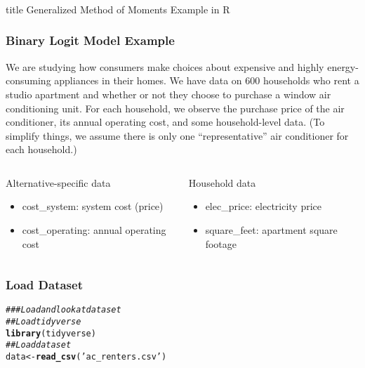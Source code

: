 \documentclass{beamer}\usepackage[]{graphicx}\usepackage[]{color}
\makeatletter
\newcommand{\hlstr}[1]{\textcolor[rgb]{0.192,0.494,0.8}{#1}}%
\newcommand{\hlcom}[1]{\textcolor[rgb]{0.678,0.584,0.686}{\textit{#1}}}%
\newcommand{\hlstd}[1]{\textcolor[rgb]{0.345,0.345,0.345}{#1}}%
\newcommand{\hlkwb}[1]{\textcolor[rgb]{0.69,0.353,0.396}{#1}}%
\newcommand{\hlkwd}[1]{\textcolor[rgb]{0.737,0.353,0.396}{\textbf{#1}}}%
\newenvironment{kframe}{%
 \def\at@end@of@kframe{}%
 \ifinner\ifhmode%
  \def\at@end@of@kframe{\end{minipage}}%
  \begin{minipage}{\columnwidth}%
 \fi\fi%
 \def\FrameCommand##1{\hskip\@totalleftmargin \hskip-\fboxsep
 \colorbox{shadecolor}{##1}\hskip-\fboxsep
     \hskip-\linewidth \hskip-\@totalleftmargin \hskip\columnwidth}%
 \MakeFramed {\advance\hsize-\width
   \@totalleftmargin\z@ \linewidth\hsize
   \@setminipage}}%
 {\par\unskip\endMakeFramed%
 \at@end@of@kframe}
\newenvironment{knitrout}{}{} %
\makeatother
\begin{document}
\begin{frame}\frametitle{}
    \vfill
    \centering
    \begin{beamercolorbox}[center]{title}
        \Large Generalized Method of Moments Example in R
    \end{beamercolorbox}
    \vfill
\end{frame}

\begin{frame}\frametitle{Binary Logit Model Example}
    We are studying how consumers make choices about expensive and highly energy-consuming appliances in their homes. We have data on 600 households who rent a studio apartment and whether or not they choose to purchase a window air conditioning unit. For each household, we observe the purchase price of the air conditioner, its annual operating cost, and some household-level data. (To simplify things, we assume there is only one ``representative'' air conditioner for each household.)
    \vspace{3ex}
    \begin{columns}
        \begin{column}{0.5\textwidth}
            Alternative-specific data
            \begin{itemize}
                \item cost\_system: system cost (price)
                \item cost\_operating: annual operating cost
            \end{itemize}
        \end{column}
        \begin{column}{0.5\textwidth}
            Household data
            \begin{itemize}
                \item elec\_price: electricity price
                \item square\_feet: apartment square footage
            \end{itemize}
            \vspace{2ex}
        \end{column}
    \end{columns}
\end{frame}

\begin{frame}[fragile]\frametitle{Load Dataset}
\begin{knitrout}\footnotesize
{}\color{fgcolor}\begin{kframe}
\begin{alltt}
\hlcom{### Load and look at dataset}
\hlcom{## Load tidyverse}
\hlkwd{library}\hlstd{(tidyverse)}
\hlcom{## Load dataset}
\hlstd{data} \hlkwb{<-} \hlkwd{read_csv}\hlstd{(}\hlstr{'ac_renters.csv'}\hlstd{)}
\end{alltt}
\end{kframe}
\end{knitrout}
\end{frame}
\end{document}
